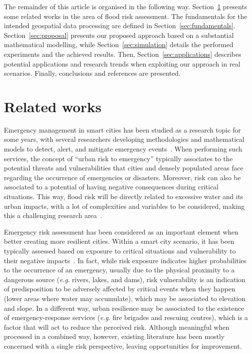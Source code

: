 \begin{refsection}
The remainder of this article is organised in the following way. Section~\ref{sec:related_works} presents some related works in the area of flood risk assessment. The fundamentals for the intended geospatial data processing are defined in Section~\ref{sec:fundamentals}. Section~\ref{sec:proposal} presents our proposed approach based on a substantial mathematical modelling, while Section~\ref{sec:simulation} details the performed experiments and the achieved results. Then, Section~\ref{sec:applications} describes potential applications and research trends when exploiting our approach in real scenarios. Finally, conclusions and references are presented.

\section{Related works}\label{sec:related_works}

Emergency management in smart cities has been studied as a research topic for some years, with several researchers developing methodologies and mathematical models to detect, alert, and mitigate emergency events~\cite{survey,survey2}. When performing such services, the concept of ``urban risk to emergency'' typically associates to the potential threats and vulnerabilities that cities and densely populated areas face regarding the occurrence of emergencies or disasters. Moreover, risk can also be associated to a potential of having negative consequences during critical situations. This way, flood risk will be directly related to excessive water and its urban impacts, with a lot of complexities and variables to be considered, making this a challenging research area~\cite{floodrisk,floodrisk2}.

Emergency risk assessment has been considered as an important element when better creating more resilient cities. Within a smart city scenario, it has been typically assessed based on exposure to critical situations and vulnerability to their negative impacts~\cite{risks1}. In fact, while risk exposure indicates higher probabilities to the occurrence of an emergency, usually due to the physical proximity to a dangerous source (\textit{e.g}. rivers, lakes, and dams), risk vulnerability is an indication of predisposition to be adversely affected by critical events when they happen (lower areas where water may accumulate), which may be associated to elevation and slope. In a different way, urban resilience may be associated to the existence of emergency-response services (\textit{e.g}. fire brigades and rescuing centres), which is a factor that will act to reduce the perceived risk. Although meaningful when processed in a combined way, however, existing literature has been mostly concerned with a single risk perspective, leaving opportunities for improvement.


\end{refsection}

